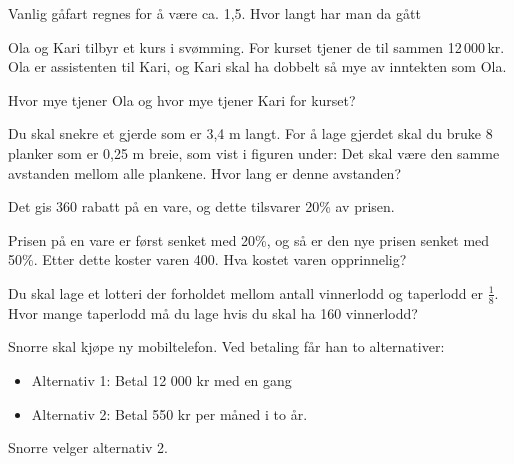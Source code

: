 



\opgt
\nes
{}
Vanlig gåfart regnes for å være ca. 1,5. Hvor langt har man da gått

Ola og Kari tilbyr et kurs i svømming. For kurset tjener de til sammen 12\,000\,kr. Ola er assistenten til Kari, og Kari skal ha dobbelt så mye av inntekten som Ola. \os

Hvor mye tjener Ola og hvor mye tjener Kari for kurset?

Du skal snekre et gjerde som er 3,4 m langt. For å lage gjerdet skal du bruke 8 planker som er 0,25 m breie, som vist i figuren under:
Det skal være den samme avstanden mellom alle plankene. Hvor lang er denne avstanden?

 \vs
{}

 \vs
{}

Det gis 360 rabatt på en vare, og dette tilsvarer 20\% av prisen.

Prisen på en vare er først senket med 20\%, og så er den nye prisen senket med 50\%. Etter dette koster varen 400. Hva kostet varen opprinnelig?

Du skal lage et lotteri der forholdet mellom antall vinnerlodd og taperlodd er $ \frac{1}{8} $. Hvor mange taperlodd må du lage hvis du skal ha 160 vinnerlodd?


Snorre skal kjøpe ny mobiltelefon.
Ved betaling får han to alternativer:
\begin{itemize}
	\item Alternativ 1: Betal 12 000 kr med en gang
\item Alternativ 2: Betal 550 kr per måned i to år.
\end{itemize}
Snorre velger alternativ 2. \os

